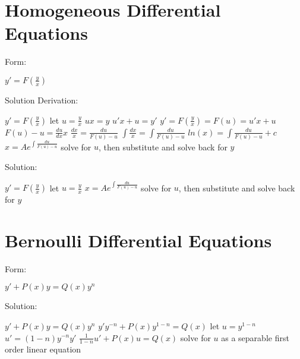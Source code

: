 \documentclass[12 pt, oneside]{book}
\begin{document}
\section{Homogeneous Differential Equations}
Form:
\begin{mathline}
$y'=F(\frac{y}{x})$
\end{mathline}
Solution Derivation:
\begin{mathline}
$y'=F(\frac{y}{x})$\newline{}
\indent let $u=\frac{y}{x}$\newline{}
\indent $ux=y$\newline{}
\indent $u'x+u=y'$\newline{}
$y'=F(\frac{y}{x})=F(u)=u'x+u$\newline{}
$F(u)-u=\frac{du}{dx}x$\newline{}
$\frac{dx}{x}=\frac{du}{F(u)-u}$\newline{}
$\int \frac{dx}{x}=\int \frac{du}{F(u)-u}$\newline{}
$ln(x)=\int \frac{du}{F(u)-u}+c$\newline{}
$x=Ae^{\int \frac{du}{F(u)-u}}$\newline{}
solve for $u$, then substitute and solve back for $y$
\end{mathline}
Solution:
\begin{mathline}
$y'=F(\frac{y}{x})$\newline{}
let $u=\frac{y}{x}$\newline{}
$x=Ae^{\int \frac{du}{F(u)-u}}$\newline{}
solve for $u$, then substitute and solve back for $y$
\end{mathline}

\section{Bernoulli Differential Equations}
Form:
\begin{mathline}
$y'+P(x)y=Q(x)y^n$
\end{mathline}
Solution:
\begin{mathline}
$y'+P(x)y=Q(x)y^n$\newline{}
$y'y^{-n}+P(x)y^{1-n}=Q(x)$\newline{}
\indent let $u=y^{1-n}$\newline{}
\indent $u'=(1-n)y^{-n}y'$\newline{}
$\frac{1}{1-n}u'+P(x)u=Q(x)$
solve for $u$ as a separable first order linear equation
\end{mathline}
\end{document}
